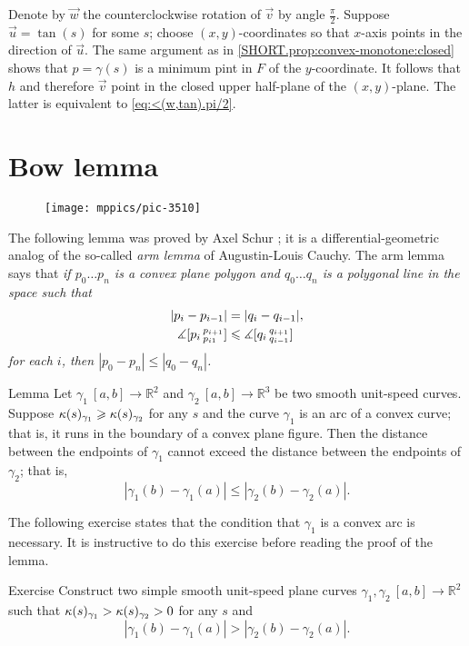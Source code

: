 Denote by $\vec w$ the counterclockwise rotation of $\vec v$ by angle $\tfrac\pi 2$.
Suppose $\vec u=\tan (s)$ for some $s$;
choose $(x,y)$-coordinates so that $x$-axis points in the direction of $\vec u$.
The same argument as in \ref{SHORT.prop:convex-monotone:closed} shows that 
$p=\gamma(s)$ is a minimum pint in $F$ of the $y$-coordinate.
It follows that $h$ and therefore $\vec v$ point in the closed upper half-plane of the $(x,y)$-plane.
The latter is equivalent to \ref{eq:<(w,tan).pi/2}.
\qeds

\section{Bow lemma}

\begin{wrapfigure}{r}{39 mm}
\vskip-4mm
\centering
\texttt{[image: mppics/pic-3510]}
\vskip0mm
\end{wrapfigure}

The following lemma was proved by Axel Schur \cite{shur};
it is a differential-geometric analog of the so-called {}\emph{arm lemma} of Augustin-Louis Cauchy.
The arm lemma says that 
\textit{if $p_0\dots p_n$ is a convex plane polygon and $q_0\dots q_n$ is a polygonal line in the space such that 
\begin{align*}
|p_i-p_{i-1}|&=|q_i-q_{i-1}|,
\\
\measuredangle[p_i\,{}^{p_{i+1}}_{p_{i1}}]&\leqslant \measuredangle[q_i\,{}^{q_{i+1}}_{q_{i-1}}]
\end{align*}
for each $i$, then $|p_0-p_n|\le |q_0-q_n|$.}


\begin{thm}{Lemma}\label{lem:bow}
Let $\gamma_1\:[a,b]\to\mathbb{R}^2$ and $\gamma_2\:[a,b] \to\mathbb{R}^3$ be two smooth unit-speed curves.
Suppose $\kappa(s)_{\gamma_1}\geqslant\kappa(s)_{\gamma_2}$ for any $s$ 
and the curve
$\gamma_1$ is an arc of a convex curve; that is, it runs in the boundary of a convex plane figure.
Then the distance between the endpoints of $\gamma_1$ cannot exceed the  distance between the endpoints of $\gamma_2$; that is,
\[|\gamma_1(b)-\gamma_1(a)|\le |\gamma_2(b)-\gamma_2(a)|.\]

\end{thm}

The following exercise states that the condition that $\gamma_1$ is a convex arc is necessary.
It is instructive to do this exercise before reading the proof of the lemma.

{\sloppy 

\begin{thm}{Exercise}\label{ex:anti-bow}
Construct two simple smooth unit-speed plane curves $\gamma_1,\gamma_2\:[a,b]\to\mathbb{R}^2$ such that $\kappa(s)_{\gamma_1}>\kappa(s)_{\gamma_2}>0$ for any $s$ and
\[|\gamma_1(b)-\gamma_1(a)|> |\gamma_2(b)-\gamma_2(a)|.\]
\end{thm}

}

